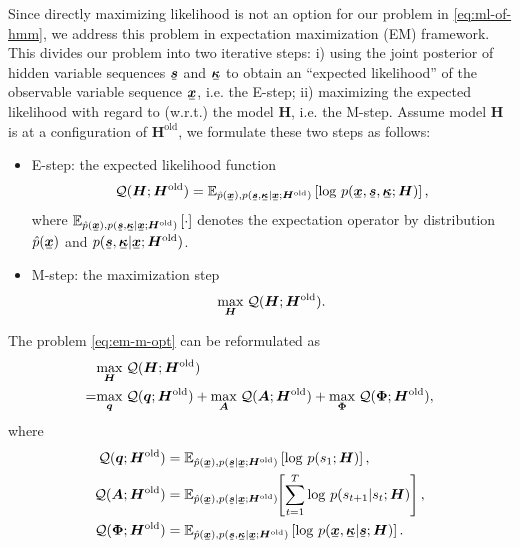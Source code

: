 \documentclass[letterpaper]{article} %
\newcommand{\ubar}[1]{\mkern2mu\underline{\mkern-2mu #1\mkern-2mu}\mkern2mu}
\newcommand{\ubm}[1]{\ubar{\bm{#1}}}
\begin{document}
Since directly maximizing likelihood is not an option for our problem in \eqref{eq:ml-of-hmm}, we address this problem in expectation maximization (EM) framework. This divides our problem into  two iterative steps: i) using the joint posterior of hidden variable sequences $\ubm{s}$ and $\ubm{\kappa}$ to obtain an ``expected likelihood'' of the observable variable sequence $\ubm{x}$, i.e. the E-step; ii) maximizing the expected likelihood with regard to (w.r.t.) the model $\bm{H}$, i.e. the M-step. Assume model $\bm{H}$ is at a configuration of $\bm{H}^{\mathrm{old}}$, we formulate these two steps as follows:
\begin{itemize}
\item E-step: %
  the expected likelihood function
  \begin{equation}\label{eq:em-q-funciton}
    \Qq(\bm{H}; \bm{H}^{\mathrm{old}}) = \EE_{\hat{p}(\ubm{x}),p(\ubm{s},\ubm{\kappa}| \ubm{x}; \bm{H}^{\mathrm{old}})}\left[ \log\,p(\ubm{x}, \ubm{s}, \ubm{\kappa}; \bm{H})\right],
  \end{equation}
  where $\EE_{\hat{p}(\ubm{x}),p(\ubm{s},\ubm{\kappa}| \ubm{x}; \bm{H}^{\mathrm{old}})}\left[ \cdot\right]$ denotes the expectation operator by distribution $\hat{p}(\ubm{x})$ and $p(\ubm{s},\ubm{\kappa}| \ubm{x}; \bm{H}^{\mathrm{old}})$.
\item M-step: the maximization step
  \begin{equation}\label{eq:em-m-opt}
    \underset{\bm{H}}{\max}\; \mathcal{Q}(\bm{H}; \bm{H}^{\mathrm{old}}).
  \end{equation}
\end{itemize}


The problem \eqref{eq:em-m-opt} can be reformulated as
\begin{align}\label{eq:m-step-subs}
  &\underset{\bm{H}}{\max}\; \mathcal{Q}(\bm{H}; \bm{H}^{\mathrm{old}}) \nonumber \\
  =&\underset{\bm{q}}{\max}\;\mathcal{Q}(\bm{q}; \bm{H}^{\mathrm{old}}) + \underset{\bm{A}}{\max}\;\mathcal{Q}(\bm{A}; \bm{H}^{\mathrm{old}}) 
     + \underset{\bm{\Phi}}{\max}\;\mathcal{Q}(\bm{\Phi}; \bm{H}^{\mathrm{old}}),
\end{align}
where
\begin{align}
  \Qq(\bm{q}; \bm{H}^{\mathrm{old}}) 
    &= \EE_{\hat{p}(\ubm{x}),p(\ubm{s}| \ubm{x}; \bm{H}^{\mathrm{old}})} \left[ \log\,p({s}_{1};\bm{H})  \right], \label{eq:init-distribution-update}\\
  \Qq(\bm{A}; \bm{H}^{\mathrm{old}}) &=\EE_{\hat{p}(\ubm{x}),p(\ubm{s}| \ubm{x}; \bm{H}^{\mathrm{old}})}\hspace{-0.1cm}\left[ \sum_{t=1}^{T}\log\,p({s}_{t+1}|{s}_{t}; \bm{H}) \right], \label{eq:transition-update}\\
  \Qq(\bm{\Phi}; \bm{H}^{\mathrm{old}}) &= \EE_{\hat{p}(\ubm{x}),p(\ubm{s},\ubm{\kappa}| \ubm{x}; \bm{H}^{\mathrm{old}})} \left[ \log\,p(\ubm{x}, \ubm{\kappa}| \ubm{s}; \bm{H}) \right]. \label{eq:generative-model-update}
\end{align}
\end{document}
